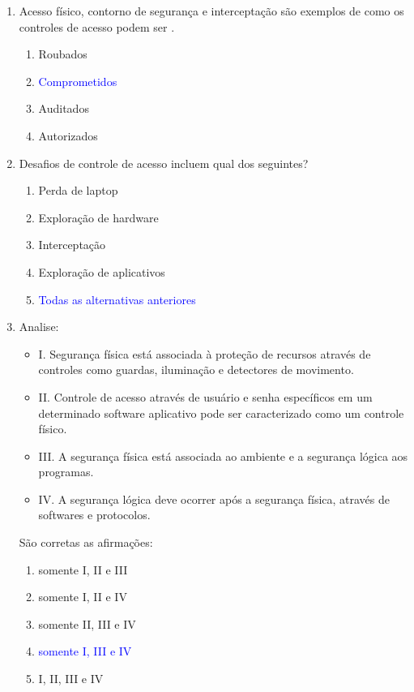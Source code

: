 \documentclass{report}
\begin{document}
\begin{enumerate}
		\item Acesso físico, contorno de segurança e interceptação são exemplos de como os controles de acesso podem ser .
		\begin{enumerate}[label=(\alph*)]
			\item Roubados
			\item \textcolor{blue}{Comprometidos}
			\item Auditados
			\item Autorizados
		\end{enumerate}
		
		\item Desafios de controle de acesso incluem qual dos seguintes?
		\begin{enumerate}[label=(\alph*)]
			\item Perda de laptop
			\item Exploração de hardware
			\item Interceptação
			\item Exploração de aplicativos
			\item \textcolor{blue}{Todas as alternativas anteriores}
		\end{enumerate}
		
		\item Analise:
		\begin{itemize}
			\item I. Segurança física está associada à proteção de recursos através de controles como guardas, iluminação e detectores de movimento.
			\item II. Controle de acesso através de usuário e senha específicos em um determinado software aplicativo pode ser caracterizado como um controle físico.
			\item III. A segurança física está associada ao ambiente e a segurança lógica aos programas.
			\item IV. A segurança lógica deve ocorrer após a segurança física, através de softwares e protocolos.
		\end{itemize}
		São corretas as afirmações:
		\begin{enumerate}[label=(\alph*)]
			\item somente I, II e III
			\item somente I, II e IV
			\item somente II, III e IV
			\item \textcolor{blue}{somente I, III e IV}
			\item I, II, III e IV
		\end{enumerate}
		

\end{enumerate}
\end{document}
